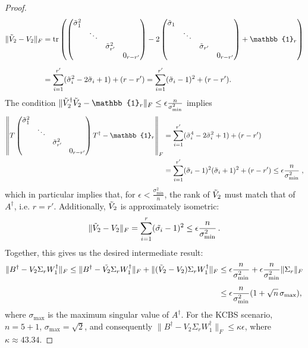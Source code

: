 \begin{proof}
\begin{align*}
\|\Tilde{V}_2-V_2\|_F & =\operatorname{tr}\left(
\begin{pmatrix}
\Tilde{\sigma}_1^2&&&\\
&\ddots&&\\
&&\Tilde{\sigma}_{r'}^2&\\
&&& 0_{r-r'}
\end{pmatrix} -2
\begin{pmatrix}
\Tilde{\sigma}_1&&&\\
&\ddots&&\\
&&\Tilde{\sigma}_{r'}&\\
&&& 0_{r-r'}
\end{pmatrix}+\mathbb{1}_r\right)\\[0.5em] &  =\sum_{i=1}^{r'}(\Tilde{\sigma}_i^2-2\Tilde{\sigma}_i+1) + (r-r') =\sum_{i=1}^{r'}(\Tilde{\sigma}_i-1)^2+(r-r').
\end{align*}
The condition $\|\Tilde{V}_2^{\dag}\Tilde{V}_2 -\mathbb{1}_r\|_F\leq\epsilon\frac{n}{\sigma_{\text{min}}^2}$ implies
\begin{align*}
\left\|T
\begin{pmatrix}
\Tilde{\sigma}_1^2&&& \\
&\ddots&& \\
&&\Tilde{\sigma}_{r'}^2& \\
&&&0_{r-r'}
\end{pmatrix}T^{\dag}-\mathbb{1}_r\right\|_F & =\sum_{i=1}^{r'}(\Tilde{\sigma}_i^4-2\Tilde{\sigma}_i^2+1) + (r-r') \\
& = \sum_{i=1}^{r'}(\Tilde{\sigma}_i-1)^2(\Tilde{\sigma}_i+1)^2 + (r-r')\leq \epsilon\frac{n}{\sigma_{\text{min}}^2}\;,
\end{align*}
which in particular implies that, for $\epsilon<\frac{\sigma_{\text{min}}^2}{n}$, the rank of $\Tilde{V}_2$ must match that of $A^{\dag}$, i.e. $r=r'$. Additionally, $\Tilde{V}_2$ is approximately isometric:
\begin{equation*}
\|\Tilde{V}_2-V_2\|_F = \sum_{i=1}^r(\Tilde{\sigma_i}-1)^2\leq\epsilon\frac{n}{\sigma_{\text{min}}^2}\thinspace.
\end{equation*}
Together, this gives us the desired intermediate result:
\begin{align*}
\|B^{\dag}-V_2\Sigma_r W_1^{\dag}\|_F\leq \|B^{\dag}-\Tilde{V_2}\Sigma_r W_1^{\dag}\|_F + \|(\Tilde{V}_2-V_2)\Sigma_r W_1^{\dag}\|_F & \leq \epsilon\frac{n}{\sigma_{\text{min}}^2}+\epsilon\frac{n}{\sigma_{\text{min}}^2}\|\Sigma_r\|_F\\[0.5em]
& \leq \epsilon\frac{n}{\sigma_{\text{min}}^2}(1+\sqrt{n}\thinspace\sigma_{\text{max}}),
\end{align*}
where $\sigma_{\text{max}}$ is the maximum singular value of $A^{\dag}$. For the KCBS scenario, $n=5+1$, $\sigma_{\text{max}}=\sqrt{2}$, and consequently $\|B^{\dag}-V_2\Sigma_r W_1^{\dag}\|_F\leq \kappa\epsilon$, where $\kappa \approx 43.34$.


\end{proof}
